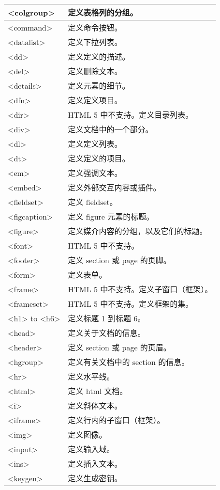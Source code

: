 \begin{longtable}{|p{80pt}|p{260pt}|}
\hline
<colgroup>	&定义表格列的分组。\\
\hline
<command>	&定义命令按钮。\\
\hline
<datalist>	&定义下拉列表。\\
\hline
<dd>		&定义定义的描述。\\
\hline
<del>		&定义删除文本。\\
\hline
<details>		&定义元素的细节。\\
\hline
<dfn>		&定义定义项目。\\
\hline
<dir>		&HTML 5 中不支持。定义目录列表。\\
\hline
<div>		&定义文档中的一个部分。\\
\hline
<dl>			&定义定义列表。\\
\hline
<dt>			&定义定义的项目。\\
\hline
<em>		&定义强调文本。\\
\hline
<embed>		&定义外部交互内容或插件。\\
\hline
<fieldset>	&定义 fieldset。\\
\hline
<figcaption>	&定义 figure 元素的标题。\\
\hline
<figure>		&定义媒介内容的分组，以及它们的标题。\\
\hline
<font>		&HTML 5 中不支持。\\
\hline
<footer>		&定义 section 或 page 的页脚。\\
\hline
<form>		&定义表单。\\
\hline
<frame>		&HTML 5 中不支持。定义子窗口（框架）。\\
\hline
<frameset>	&HTML 5 中不支持。定义框架的集。\\
\hline
<h1> to <h6>	&定义标题 1 到标题 6。\\
\hline
<head>		&定义关于文档的信息。\\
\hline
<header>		&定义 section 或 page 的页眉。\\
\hline
<hgroup>		&定义有关文档中的 section 的信息。\\
\hline
<hr>			&定义水平线。\\
\hline
<html>		&定义 html 文档。\\
\hline
<i>			&定义斜体文本。\\
\hline
<iframe>		&定义行内的子窗口（框架）。\\
\hline
<img>		&定义图像。\\
\hline
<input>		&定义输入域。\\
\hline
<ins>		&定义插入文本。\\
\hline
<keygen>		&定义生成密钥。\\

\end{longtable}
